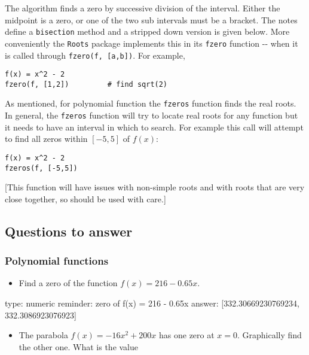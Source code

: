 \documentclass[12pt]{article}
\begin{document}
The algorithm finds a zero by successive division of the interval.
Either the midpoint is a zero, or one of the two sub intervals must be a
bracket. The notes define a \texttt{bisection} method and a stripped
down version is given below. More conveniently the \texttt{Roots}
package implements this in its \texttt{fzero} function -{}- when it is
called through \texttt{fzero(f, {[}a,b{]})}. For example,



\begin{verbatim}
f(x) = x^2 - 2
fzero(f, [1,2])         # find sqrt(2)
\end{verbatim}
As mentioned, for polynomial function the \texttt{fzeros} function finds
the real roots. In general, the \texttt{fzeros} function will try to
locate real roots for any function but it needs to have an interval in
which to search. For example this call will attempt to find all zeros
within $[-5,5]$ of $f(x)$:



\begin{verbatim}
f(x) = x^2 - 2
fzeros(f, [-5,5])
\end{verbatim}
{[}This function will have issues with non-simple roots and with roots
that are very close together, so should be used with care.{]}

\subsection{Questions to answer}

\subsubsection{Polynomial functions}

\begin{itemize}
\itemsep1pt\parskip0pt
\item
  Find a zero of the function $f(x) = 216 - 0.65x$.
\end{itemize}

\begin{answer}
    type: numeric
    reminder: zero of f(x) = 216 - 0.65x
    answer: [332.30669230769234, 332.3086923076923]

\end{answer}

\begin{itemize}
\itemsep1pt\parskip0pt
\item
  The parabola $f(x) = -16x^2 + 200x$ has one zero at $x=0$. Graphically
  find the other one. What is the value
\end{itemize}
\end{document}
